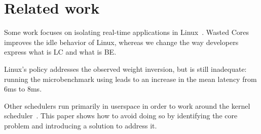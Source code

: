 \section{Related work}

Some work focuses on isolating real-time applications in
Linux~\cite{rt-in-linux, state-rt-linux}. Wasted Cores~\cite{wasted-cores}
improves the idle behavior of Linux, whereas we change the way developers
express what is LC and what is BE.

Linux's \schedidle{} policy addresses the observed weight inversion, but is
still inadequate: running the microbenchmark using \schedidle{} leads to an
increase in the mean latency from 6ms to 8ms.

Other schedulers run primarily in userspace in order to work around the kernel
scheduler~\cite{perfiso,caladan,skyloft}. This paper shows how to avoid doing so
by identifying the core problem and introducing a solution to address it.